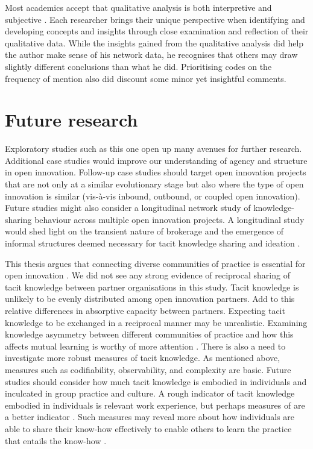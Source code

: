 Most academics accept that qualitative analysis is both interpretive and subjective \citep{aspers2019qualitative}. Each researcher brings their unique perspective when identifying and developing concepts and insights through close examination and reflection of their qualitative data. While the insights gained from the qualitative analysis did help the author make sense of his network data, he recognises that others may draw slightly different conclusions than what he did. Prioritising codes on the frequency of mention also did discount some minor yet insightful comments.

\section{Future research}

Exploratory studies such as this one open up many avenues for further research. Additional case studies would improve our understanding of agency and structure in open innovation. Follow-up case studies should target open innovation projects that are not only at a similar evolutionary stage but also where the type of open innovation is similar (vis-\`a-vis inbound, outbound, or coupled open innovation). Future studies might also consider a longitudinal network study of knowledge-sharing behaviour across multiple open innovation projects. A longitudinal study would shed light on the transient nature of brokerage and the emergence of informal structures deemed necessary for tacit knowledge sharing and ideation \citep{quintane2021temporal}.  \medskip

This thesis argues that connecting diverse communities of practice is essential for open innovation \citep{brown2001knowledge}. We did not see any strong evidence of reciprocal sharing of tacit knowledge between partner organisations in this study. Tacit knowledge is unlikely to be evenly distributed among open innovation partners. Add to this relative differences in absorptive capacity between partners. Expecting tacit knowledge to be exchanged in a reciprocal manner may be unrealistic. Examining knowledge asymmetry between different communities of practice and how this affects mutual learning is worthy of more attention \citep{liu2021more}. There is also a need to investigate more robust measures of tacit knowledge. As mentioned above, measures such as codifiability, observability, and complexity are basic. Future studies should consider how much tacit knowledge is embodied in individuals and inculcated in group practice and culture. A rough indicator of tacit knowledge embodied in individuals is relevant work experience, but perhaps measures of  are a better indicator \citep{hedlund2002tacit}. Such measures may reveal more about how individuals are able to share their know-how effectively to enable others to learn the practice that entails the know-how \citep{van1986central, cook1999bridging}. \medskip 

